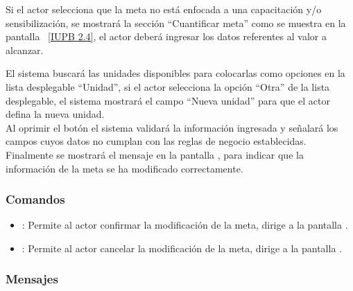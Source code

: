   Si el actor selecciona que la meta no está enfocada a una capacitación y/o sensibilización, se mostrará la sección ``Cuantificar meta'' como se muestra en la pantalla ~\ref{IUPB 2.4}, el actor 
  deberá ingresar los datos referentes al valor a alcanzar.\\
 

  
  El sistema buscará las unidades disponibles para colocarlas como opciones en la lista desplegable ``Unidad'', si el actor selecciona la opción ``Otra'' de la lista desplegable, el sistema mostrará
  el campo ``Nueva unidad'' para que el actor defina la nueva unidad.\\
  
  Al oprimir el botón  el sistema validará la información ingresada y señalará los campos cuyos datos no cumplan con las reglas de negocio establecidas.\\
  
  Finalmente se mostrará el mensaje  en la pantalla , para indicar que la información de la
  meta se ha modificado correctamente.
    
\subsubsection{Comandos}
\begin{itemize}
	\item {}: Permite al actor confirmar la modificación de la meta, dirige a la pantalla .
	\item {}: Permite al actor cancelar la modificación de la meta, dirige a la pantalla .
\end{itemize}


\subsubsection{Mensajes}

